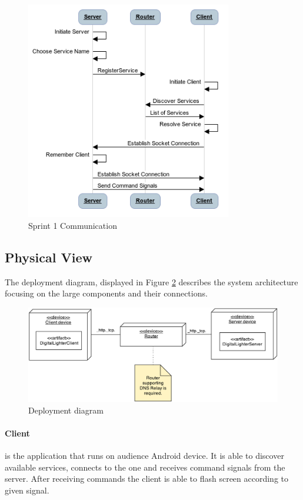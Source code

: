 \begin{figure}[H]
	\centering
		\includegraphics[width=9cm]{sprint1/communication.png}
	\caption{Sprint 1 Communication}
	\label{fig:sprint1_communication}
\end{figure}

\subsection{Physical View}
The deployment diagram, displayed in Figure \ref{fig:deployment_diagram} describes the system architecture focusing on the large components and their connections.

\begin{figure}[H]
	\centering
		\includegraphics[width=15cm]{images/deployment-diagram-sprint1}
	\caption{Deployment diagram}
	\label{fig:deployment_diagram}
\end{figure}

\paragraph{Client}
is the application that runs on audience Android device. It is able to discover available services, connects to the one and receives command signals from the server. After receiving commands the client is able to flash screen according to given signal.


